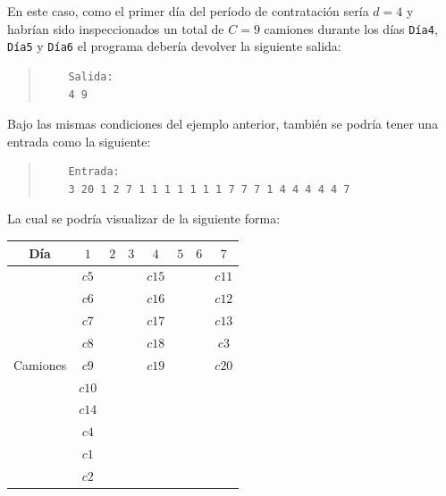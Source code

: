\documentclass[11pt, a4paper, twoside]{article}
\begin{document}
\begin{ejemplo}
    En este caso, como el primer día del período de contratación sería $d=4$ y habrían sido
    inspeccionados un total de $C=9$ camiones durante los días \texttt{Día4}, \texttt{Día5}
    y \texttt{Día6} el programa debería devolver la siguiente salida:

  \begin{quote}
    \begin{verbatim}
    Salida:
    4 9
    \end{verbatim}
  \end{quote}

\end{ejemplo}

\begin{ejemplo}\hspace{0em}

Bajo las mismas condiciones del ejemplo anterior, también
se podría tener una entrada como la siguiente:

  \begin{quote}
    \begin{verbatim}
    Entrada:
    3 20 1 2 7 1 1 1 1 1 1 1 7 7 7 1 4 4 4 4 4 7
    \end{verbatim}
  \end{quote}

  \vspace{-2em}
  \begin{center}
    La cual se podría visualizar de la siguiente forma:

    \renewcommand{\arraystretch}{1.2} %
    \begin{tabular}{|c|c|c|c|c|c|c|c|}
      \hline
      Día          &  $1$  & $2$   & $3$   & $4$    & $5$ & $6$ & $7$   \\
      \hline
                     &  $c5$ &       &       & $c15$  &     &     & $c11$ \\
                     &  $c6$ &       &       & $c16$  &     &     & $c12$ \\
                     &  $c7$ &       &       & $c17$  &     &     & $c13$ \\
                     &  $c8$ &       &       & $c18$  &     &     & $c3$  \\
      Camiones     &  $c9$ &       &       & $c19$  &     &     & $c20$ \\
                     &  $c10$&       &       &        &     &     &       \\
                     &  $c14$&       &       &        &     &     &       \\
                     &  $c4$ &       &       &        &     &     &       \\
                     &  $c1$ &       &       &        &     &     &       \\
                     &  $c2$ &       &       &        &     &     &       \\
      \hline
    \end{tabular}
  \end{center}


\end{ejemplo}
\end{document}
